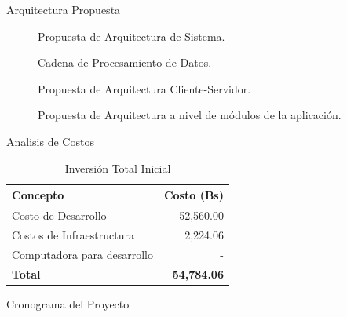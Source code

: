 \documentclass[spanish]{beamer} %
\begin{document}
\begin{frame}[allowframebreaks]{Arquitectura Propuesta}

  \begin{figure}[H]
    \centering
      \resizebox{\textwidth}{!}{
          {\setlength{\fboxsep}{14pt} %
          \fbox{}}}
    \caption{Propuesta de Arquitectura de Sistema.}
    \label{fig:arc_sys} 
  \end{figure}  

  \begin{figure}[h]
    \centering
      \resizebox{\textwidth}{!}{
          {\setlength{\fboxsep}{14pt} %
          \fbox{}}}
    \caption{Cadena de Procesamiento de Datos.}
    \label{fig:basic_data_pipeline} 
  \end{figure}

  \begin{figure}[h]
    \centering
      \resizebox{\textwidth}{!}{
          {\setlength{\fboxsep}{14pt} %
          \fbox{}}}
    \caption{Propuesta de Arquitectura Cliente-Servidor.}
    \label{fig:arc_client_server} 
  \end{figure}

  \begin{figure}[H]
    \centering
      \resizebox{\textwidth}{!}{
          {\setlength{\fboxsep}{14pt} %
          \fbox{}}}
    \caption{Propuesta de Arquitectura a nivel de módulos de la aplicación.}
    \label{fig:arc_modulos} 
  \end{figure}
  
\end{frame}

\begin{frame}{Analisis de Costos}

  \begin{table}[ht]
    \centering
    \caption{Inversión Total Inicial}
    \label{tab:inversion_total}
    \begin{tabularx}{\textwidth}{|X|r|}
        \hline
        \textbf{Concepto} & \textbf{Costo (Bs)} \\
        \hline
        Costo de Desarrollo & 52,560.00 \\
        Costos de Infraestructura & 2,224.06 \\
        Computadora para desarrollo & - \\
        \hline
        \textbf{Total} & \textbf{54,784.06} \\
        \hline
    \end{tabularx}
  \end{table} 

\end{frame}

\begin{frame}{Cronograma del Proyecto}

  {\small }

\end{frame}
\end{document}
